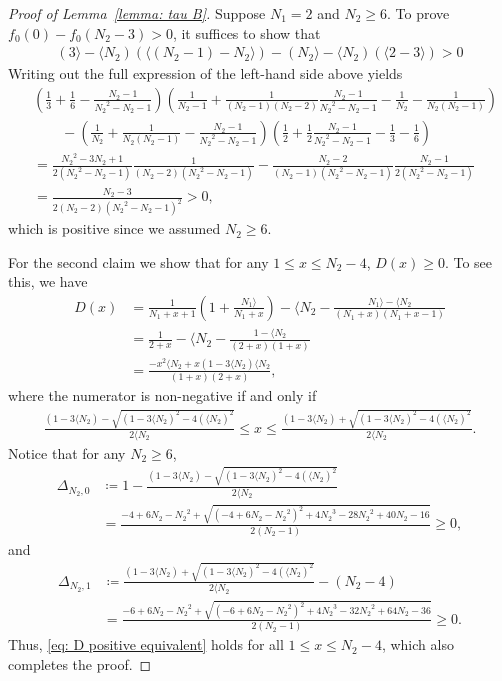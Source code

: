 \documentclass{ws-ijnt}
\begin{document}
	\begin{proof}[Proof of Lemma~\ref{lemma: tau B}]
		Suppose $N_1=2$ and $N_2\geq6$. To prove $f_0(0)-f_0(N_2-3) > 0$, it suffices to show that
		\begin{align*}
			(3\rangle-\langle N_2)(\langle (N_2-1)-N_2\rangle)- (N_2\rangle-\langle N_2)(\langle 2-3\rangle) > 0
		\end{align*}
		Writing out the full expression of the left-hand side above yields
		\begin{align*}
			&\left( \frac13 +\frac16-\frac{N_2-1}{{N_2}^2-N_2-1} \right) \left( \frac{1}{N_2-1}+\frac{1}{(N_2-1)(N_2-2)}\frac{N_2-1}{{N_2}^2-N_2-1}-\frac{1}{N_2}-\frac{1}{N_2(N_2-1)}\right) \\
			&\qquad-\left(  \frac{1}{N_2}+\frac{1}{N_2(N_2-1)}-\frac{N_2-1}{{N_2}^2-N_2-1} \right) \left( \frac12+\frac12 \frac{N_2-1}{{N_2}^2-N_2-1} -\frac13-\frac16 \right) \\
			&= \frac{{N_2}^2-3N_2+1}{2({N_2}^2-N_2-1)}\frac{1}{(N_2-2)({N_2}^2-N_2-1)}-\frac{N_2-2}{(N_2-1)({N_2}^2-N_2-1)}\frac{N_2-1}{2({N_2}^2-N_2-1)} \\
			&=\frac{N_2-3}{2(N_2-2)({N_2}^2-N_2-1)^2}>0,
		\end{align*}
		which is positive since we assumed $N_2\geq 6$.
		
		For the second claim we show that for any $1\leq x\leq N_2-4$, $D(x)\geq 0$. To see this, we have 
		\begin{align*}
			D(x)
			&=\frac{1}{N_1+x+1}\left(1+\frac{N_1\rangle}{N_1+x}\right)-\langle N_2-\frac{N_1\rangle-\langle N_2}{(N_1+x)(N_1+x-1)} \\
			&=\frac{1}{2+x}-\langle N_2-\frac{1-\langle N_2}{(2+x)(1+x)} \\
			&=\frac{ -x^2\langle N_2 +x(1-3\langle N_2)  \langle N_2}{(1+x)(2+x)}
			,
		\end{align*}
		where the numerator is non-negative if and only if
		\begin{align}
			\label{eq: D positive equivalent}
			\frac{(1-3\langle N_2)-\sqrt{(1-3\langle N_2)^2-4(\langle N_2)^2}}{2\langle N_2}
			\leq x \leq
			\frac{(1-3\langle N_2)+\sqrt{(1-3\langle N_2)^2-4(\langle N_2)^2}}{2\langle N_2}.
		\end{align}
		Notice that for any $N_2 \geq 6$,
		\begin{align*}
			\Delta_{N_2,0}
			&\coloneqq 1-\frac{(1-3\langle N_2)-\sqrt{(1-3\langle N_2)^2-4(\langle N_2)^2}}{2\langle N_2} \\
			&=\frac{-4+6{N_2}-{N_2}^{2}+\sqrt{\left(-4+6{N_2}-{N_2}^{2}\right)^2+4{N_2}^3-28{N_2}^2+40{N_2}-16}}{2({N_2}-1)}
			\geq0,
		\end{align*}
		and
		\begin{align*}
			\Delta_{N_2,1}
			&\coloneqq \frac{(1-3\langle N_2)+\sqrt{(1-3\langle N_2)^2-4(\langle N_2)^2}}{2\langle N_2}-(N_2-4) \\
			&=\frac{-6+6{N_2}-{N_2}^{2}+\sqrt{\left(-6+6{N_2}-{N_2}^{2}\right)^2+4{N_2}^3-32{N_2}^2+64{N_2}-36}}{2({N_2}-1)}
			\geq0.
		\end{align*}
		Thus, \eqref{eq: D positive equivalent} holds for all $1\leq x\leq N_2-4$, which also completes the proof.
	\end{proof}
	
\end{document}
